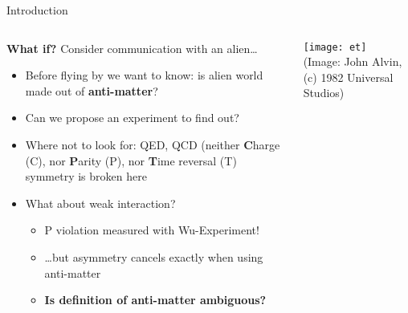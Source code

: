 \begin{frame}{Introduction}
    \begin{columns}[T]
        \begin{column}{.6\textwidth}
            \textbf{What if?} Consider communication with an alien\ldots
            \begin{itemize}
                \item<1-> Before flying by we want to know: is alien world made out of \textbf{anti-matter}\ftnt{}?
                \item<1-> Can we propose an experiment to find out?
                \item<2> Where not to look for: QED, QCD (neither \textbf{C}harge (C), nor \textbf{P}arity (P), nor \textbf{T}ime reversal (T) symmetry is broken here
                \item<2> What about weak interaction?
                \begin{itemize}
                    \item<2> P violation measured with Wu-Experiment!
                    \item<2> \ldots but asymmetry cancels exactly when using anti-matter
                    \item<2> \textbf{Is definition of anti-matter ambiguous?}
                \end{itemize}
            \end{itemize}
        \end{column}
        \begin{column}{.4\textwidth}
            \centering
            \texttt{[image: et]}\\
            {\tiny (Image: John Alvin, (c) 1982 Universal Studios)}
        \end{column}
    \end{columns}

    \vfill

    \footnotesize {}
\end{frame}

